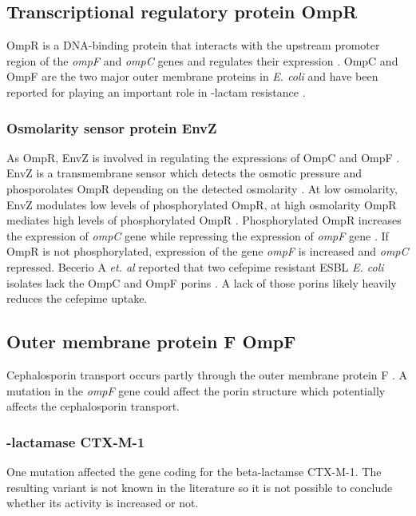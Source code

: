 \subsection{Transcriptional regulatory protein OmpR}
OmpR is a DNA-binding protein that interacts with the upstream promoter region of the \textit{ompF} and \textit{ompC} genes and regulates their expression \cite{rampersaud_ompr_1994}. OmpC and OmpF are the two major outer membrane proteins in \textit{E. coli} and have been reported for playing an important role in \textbeta-lactam resistance \cite{rampersaud_ompr_1994} \cite{fernandez_adaptive_2012}.

\subsubsection{Osmolarity sensor protein EnvZ}
As OmpR, EnvZ is involved in regulating the expressions of OmpC and OmpF \cite{rampersaud_ompr_1994}. EnvZ is a transmembrane sensor which detects the osmotic pressure and phosporolates OmpR depending on the detected osmolarity \cite{rampersaud_ompr_1994}. At low osmolarity, EnvZ modulates low levels of phosphorylated OmpR, at high osmolarity OmpR mediates high levels of phosphorylated OmpR \cite{rampersaud_ompr_1994}. Phosphorylated OmpR increases the expression of \textit{ompC} gene while repressing the expression of \textit{ompF} gene \cite{rampersaud_ompr_1994}. If OmpR is not phosphorylated, expression of the gene \textit{ompF} is increased and \textit{ompC} repressed. Becerio A \textit{et. al} reported that two cefepime resistant ESBL \textit{E. coli} isolates lack the OmpC and OmpF porins \cite{beceiro_false_2011}. A lack of those porins likely heavily reduces the cefepime uptake.   

\subsection{Outer membrane protein F OmpF}
Cephalosporin transport occurs partly through the outer membrane protein F \cite{masi_structure_2013}. A mutation in the \textit{ompF} gene could affect the porin structure which potentially affects the cephalosporin transport. 

\subsubsection{\textbeta-lactamase CTX-M-1}
One mutation affected the gene coding for the beta-lactamse CTX-M-1. The resulting variant is not known in the literature so it is not possible to conclude whether its activity is increased or not. 
 

